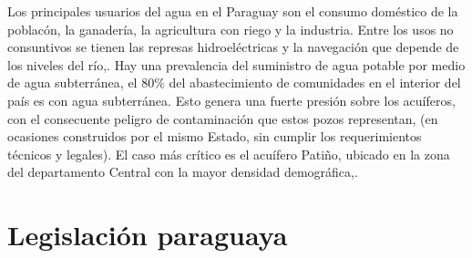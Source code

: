 Los principales usuarios del agua en el Paraguay son el consumo dom\'estico de la poblac\'on, la ganader\'ia, la agricultura con riego y la industria. 
Entre los usos no consuntivos se tienen las represas hidroel\'ectricas y la navegaci\'on que depende de los niveles del r\'io,\cite{groundwater_caracteristicas_2021}.
Hay una prevalencia del suministro de agua potable por medio de agua subterr\'anea, el 80$\%$ del abastecimiento de comunidades en el interior del pa\'is es con agua subterr\'anea. Esto genera una fuerte presi\'on sobre los acu\'iferos, con el consecuente peligro de contaminaci\'on que estos pozos representan, (en ocasiones construidos por el mismo Estado, sin cumplir los requerimientos t\'ecnicos y legales). El caso m\'as cr\'itico es el acu\'ifero Pati\~no, ubicado en la zona del departamento
Central con la mayor densidad demogr\'afica,\cite{alvarez-2014}.


\section{Legislaci\'on paraguaya}

